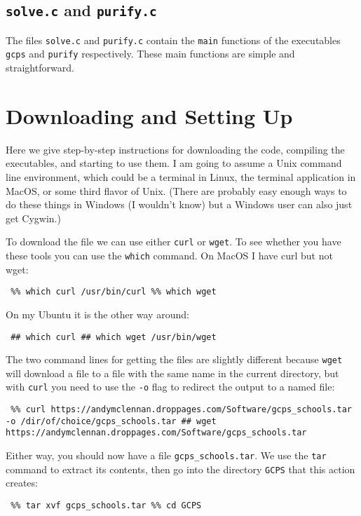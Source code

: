 \documentclass[12pt]{article}
\theoremstyle{definition}
\begin{document}
\begin{appendix}
\subsection{\texttt{solve.c} and  \texttt{purify.c}}

The files \texttt{solve.c} and \texttt{purify.c} contain the
\texttt{main} functions of the executables \texttt{gcps} and
\texttt{purify} respectively.  These main functions are
simple and straightforward.

\section{Downloading and Setting Up} \label{app:DownloadInstall}

Here we give step-by-step instructions for downloading the code,
compiling the executables, and starting to use them.  I am going to
assume a Unix command line environment, which could be a terminal in
Linux, the terminal application in MacOS, or some third flavor of
Unix.  (There are probably easy enough ways to do these things in
Windows (I wouldn't know) but a Windows user can also just get
Cygwin.)

To download the file we can use either \texttt{curl} or \texttt{wget}.
To see whether you have these tools you can use the \texttt{which}
command.  On MacOS I have curl but not wget:
\begin{obeylines}
  \texttt{
    \%\% which curl
    /usr/bin/curl
    \%\% which wget
    }
\end{obeylines}

\medskip\noindent
On my Ubuntu it is the other way around:
\begin{obeylines}
  \texttt{
    \#\# which curl
    \#\# which wget
    /usr/bin/wget
    }
\end{obeylines}
\bigskip
The two command lines for getting the files are slightly different
because \texttt{wget} will download a file to a file with the same
name in the current directory, but with \texttt{curl} you need to use
the \texttt{-o} flag to redirect the output to a named file:
\begin{obeylines}
  \texttt{
    \%\% curl https://andymclennan.droppages.com/Software/gcps\_schools.tar -o /dir/of/choice/gcps\_schools.tar
    \#\# wget https://andymclennan.droppages.com/Software/gcps\_schools.tar
    }
\end{obeylines}
\bigskip

\noindent
Either way, you should now have a file \texttt{gcps\_schools.tar}.  We use the \texttt{tar} command to
extract its contents, then go into the directory \texttt{GCPS} that this action creates:
\begin{obeylines}
  \texttt{
    \%\% tar xvf gcps\_schools.tar
    \%\% cd GCPS
    }
\end{obeylines}
\bigskip


\end{appendix}
\end{document}
